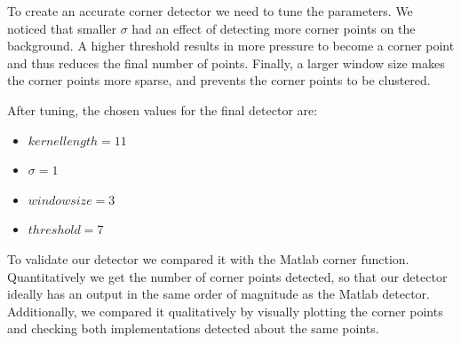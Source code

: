 \documentclass[11pt]{article}
\begin{document}
To create an accurate corner detector we need to tune the parameters. We noticed that smaller $\sigma$ had an effect of detecting more corner points on the background. A higher threshold results in more pressure to become a corner point and thus reduces the final number of points. Finally, a larger window size makes the corner points more sparse, and prevents the corner points to be clustered.

After tuning, the chosen values for the final detector are:
\begin{itemize}
	\item $kernel  length = 11$
	\item $\sigma = 1$
	\item $window  size = 3$
	\item $threshold = 7$
\end{itemize}

To validate our detector we compared it with the Matlab corner function. Quantitatively we get the number of corner points detected, so that our detector ideally has an output in the same order of magnitude as the Matlab detector. Additionally, we compared it qualitatively by visually plotting the corner points and checking both implementations detected about the same points.
 
\end{document}
